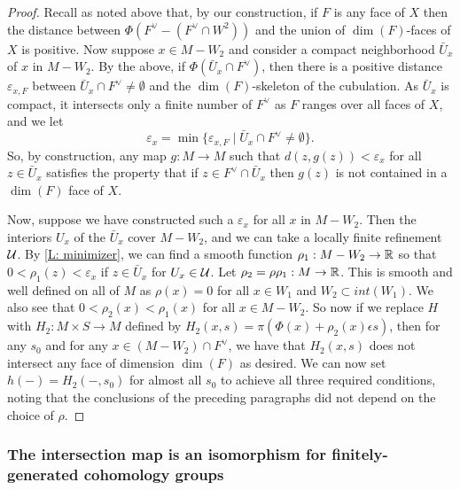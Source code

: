 \begin{proof}
Recall as noted above that, by our construction, if $F$ is any face of $X$ then the distance between $\Phi(F^\vee-(F^\vee \cap W^2))$ and the union of $\dim(F)$-faces of $X$ is positive.
Now suppose $x\in M-W_2$ and consider a compact neighborhood $\bar U_x$ of $x$ in $M-W_2$. By the above, if $\Phi(\bar U_x\cap F^\vee)$, then there is a positive distance $\varepsilon_{x,F}$ between $\bar U_x\cap F^\vee\neq \emptyset$ and the $\dim(F)$-skeleton of the cubulation. As $\bar U_x$ is compact, it intersects only a finite number of $F^\vee$ as $F$ ranges over all faces of $X$, and we let $$\varepsilon_x=\min\{\varepsilon_{x,F}\mid \bar U_x\cap F^\vee\neq \emptyset\}.$$
So, by construction, any map $g:M\to M$ such that $d(z,g(z))<\varepsilon_x$ for all $z\in \bar U_x$ satisfies the property that if $z\in F^\vee \cap \bar U_x$ then $g(z)$ is not contained in a $\dim(F)$ face of $X$. 



Now, suppose we have constructed such a $\varepsilon_x$ for all $x$ in $M-W_2$. Then the interiors $U_x$ of the $\bar U_x$ cover $M-W_2$, and  we can take a locally finite refinement $\mathcal{U}$.  By \cref{L: minimizer}, we can find a smooth function $\rho_1:M-W_2\to \mathbb{R}$ so that $0<\rho_1(z)<\varepsilon_x$ if $z\in \bar U_x$ for $U_x\in \mathcal{U}$. Let $\rho_2=\rho\rho_1:M\to \mathbb{R}$. This is smooth and well defined on all of $M$ as $\rho(x)=0$ for all $x\in W_1$ and $W_2\subset int(W_1)$. We also see that $0<\rho_2(x)<\rho_1(x)$ for all $x\in M-W_2$. So now if we replace $H$ with $H_2:M\times S\to M$ defined by  $H_2(x,s)=\pi(\Phi(x)+\rho_2(x)\epsilon s)$, then for any $s_0$ and for any $x\in (M-W_2)\cap F^\vee$, we have that  $H_2(x,s)$ does not intersect any face of dimension $\dim(F)$ as desired. We can now set $h(-)=H_2(-,s_0)$ for almost all $s_0$ to achieve all three required conditions, noting that the conclusions of the preceding paragraphs did not depend on the choice of $\rho$.
\end{proof}


\subsubsection{The intersection map is an isomorphism for finitely-generated cohomology groups}


